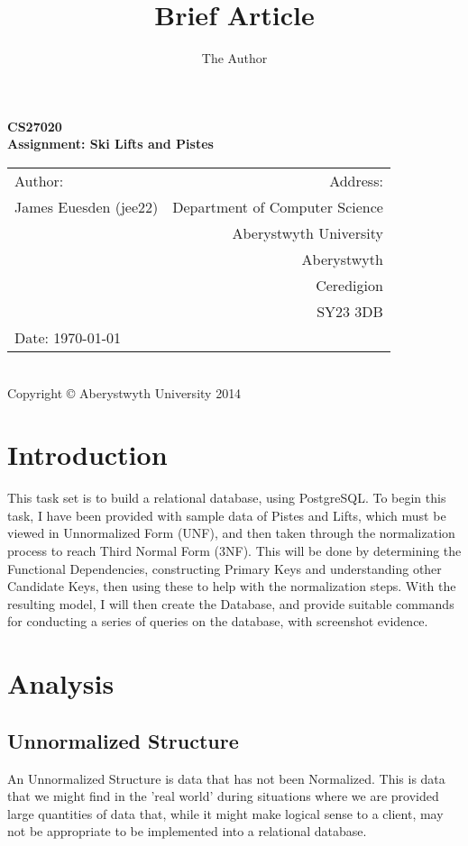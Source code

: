 \documentclass[11pt]{scrartcl} %
\title{Brief Article}
\author{The Author}
\begin{document}
\newpage

\begin{center}
\textbf{\LARGE CS27020}\\[0.5cm]

\textbf{\LARGE Assignment: Ski Lifts and Pistes }\\[13cm]

\begin{tabular}{ l | r }
{\large Author:} & {\large Address:} \\
James Euesden (jee22) &  Department of Computer Science \\
 & Aberystwyth University \\ 
 & Aberystwyth \\
 & Ceredigion \\
 & SY23 3DB \\
{\large Date:} \today  &  \\

\end{tabular} \\[0.2cm]

{\small Copyright © Aberystwyth University 2014}

\end{center}



\newpage

\section{Introduction}
This task set is to build a relational database, using PostgreSQL. To begin this task, I have been provided with sample data of Pistes and Lifts, which must be viewed in Unnormalized Form (UNF), and then taken through the normalization process to reach Third Normal Form (3NF). This will be done by determining the Functional Dependencies, constructing Primary Keys and understanding other Candidate Keys, then using these to help with the normalization steps. With the resulting model, I will then create the Database, and provide suitable commands for conducting a series of queries on the database, with screenshot evidence.
\section{Analysis}
\subsection{Unnormalized Structure}
An Unnormalized Structure is data that has not been Normalized. This is data that we might find in the 'real world' during situations where we are provided large quantities of data that, while it might make logical sense to a client, may not be appropriate to be implemented into a relational database.
\end{document}
